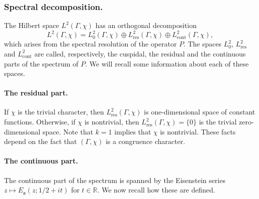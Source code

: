 \documentclass{article}
\theoremstyle{named}
\newcommand{\R}{\mathbb{R}}
\renewcommand{\a}{\mathfrak{a}}
\begin{document}
\subsubsection{Spectral decomposition.}
The Hilbert space $L^2(\Gamma, \chi)$ has an orthogonal decomposition
\begin{equation}\label{eq:orthogonaldecompositionspectrum}
    L^2(\Gamma, \chi) = L_0^2(\Gamma, \chi) \oplus L^2_\text{res}(\Gamma, \chi)\oplus L^2_{\text{cont}}(\Gamma, \chi),
\end{equation}
which arises from the spectral resolution of the operator $P$. The spaces $L_0^2$, $L^2_\text{res}$ and $L^2_\text{cont}$ are called, respectively, the cuspidal, the residual and the continuous parts of the spectrum of $P$. We will recall some information about each of these spaces.

\paragraph{The residual part.}
If $\chi$ is the trivial character, then $L^2_\text{res}(\Gamma, \chi)$ is one-dimensional space of constant functions. Otherwise, if $\chi$ is nontrivial, then $L^2_\text{res}(\Gamma, \chi) = \{0\}$ is the trivial zero-dimensional space. Note that $k = 1$ implies that $\chi$ is nontrivial. These facts depend on the fact that $(\Gamma, \chi)$ is a congruence character.

\paragraph{The continuous part.}
The continuous part of the spectrum is spanned by the Eisenstein series $z \mapsto E_\a(z; 1/2 + it)$ for $t \in \R$. We now recall how these are defined. 
\end{document}
